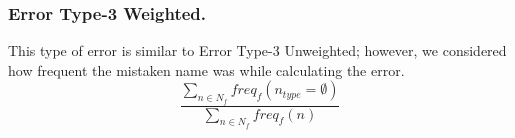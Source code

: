 \subsubsection{Error Type-3 Weighted.} This type of error is similar to Error Type-3 Unweighted; however, we considered how frequent the mistaken name was while calculating the error.
\[ \frac{\sum_{n \in N_f}freq_f(n_{type} = \emptyset)}{\sum_{n \in N_f}freq_f(n)}\]
